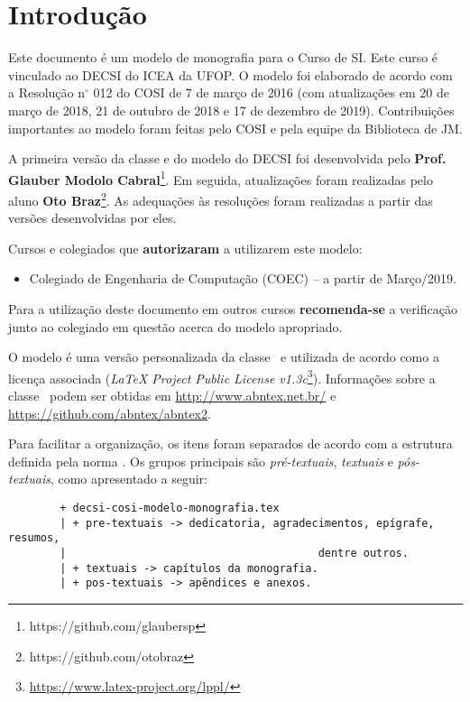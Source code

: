 \chapter{Introdução}
\label{cap:introducao}

Este documento é um modelo de monografia para o Curso de \acf{SI}. Este curso é vinculado ao \acf{DECSI} do \acf{ICEA} da \acf{UFOP}. O modelo foi elaborado de acordo com a Resolução n$^\circ$ 012 do \acf{COSI} de 7 de março de 2016 (com atualizações em 20 de março de 2018,  21 de outubro de 2018 e 17 de dezembro de 2019). Contribuições importantes ao modelo foram feitas pelo COSI e pela equipe da Biblioteca de \acf{JM}.

A primeira versão da classe e do modelo do DECSI foi desenvolvida pelo \textbf{Prof. Glauber Modolo Cabral}\footnote{https://github.com/glaubersp}. Em seguida, atualizações foram realizadas pelo aluno \textbf{Oto Braz}\footnote{https://github.com/otobraz}. As adequações às resoluções foram realizadas a partir das versões desenvolvidas por eles.

Cursos e colegiados que \textbf{autorizaram} a utilizarem este modelo:

	\begin{itemize}
		\item Colegiado de Engenharia de Computação (COEC) -- a partir de Março/2019.
	\end{itemize}

Para a utilização deste documento em outros cursos \textbf{recomenda-se} a verificação junto ao colegiado em questão acerca do modelo apropriado.

O modelo é uma versão personalizada da classe \abnTeX\ e utilizada de acordo como a licença associada (\textit{LaTeX Project Public License v1.3c}\footnote{\url{https://www.latex-project.org/lppl/}}). Informações sobre a classe \abnTeX\ podem ser obtidas em \url{http://www.abntex.net.br/} e \url{https://github.com/abntex/abntex2}.

Para facilitar a organização, os itens foram separados de acordo com a estrutura definida pela norma . Os grupos principais são \textit{pré-textuais}, \textit{textuais} e \textit{pós-textuais}, como apresentado a seguir:

\begin{verbatim}
		+ decsi-cosi-modelo-monografia.tex
		| + pre-textuais -> dedicatoria, agradecimentos, epígrafe, resumos,
		|										dentre outros.
		| + textuais -> capítulos da monografia.
		| + pos-textuais -> apêndices e anexos.
\end{verbatim}

